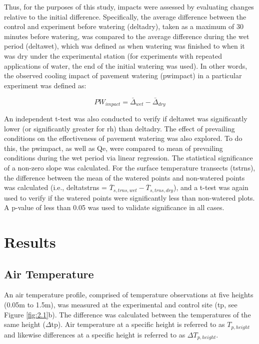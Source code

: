 \documentclass[final,3p,times,authoryear]{elsarticle}
\begin{document}
Thus, for the purposes of this study, impacts were assessed by evaluating changes relative to the initial difference. Specifically, the average difference between the control and experiment before watering (\gls{deltadry}), taken as a maximum of 30 minutes before watering, was compared to the average difference during the wet period (\gls{deltawet}), which was defined as when watering was finished to when it was dry under the experimental station (for experiments with repeated applications of water, the end of the initial watering was used). In other words, the observed cooling impact of pavement watering (\gls{pwimpact}) in a particular experiment was defined as:

\begin{equation}
PW_{impact} = \bar{\Delta}_{wet} - \bar{\Delta}_{dry}
\label{eq:2.2} 
\end{equation}

An independent t-test was also conducted to verify if \gls{deltawet} was significantly lower (or significantly greater for \gls{rh}) than \gls{deltadry}. The effect of prevailing conditions on the effectiveness of pavement watering was also explored. To do this, the \gls{pwimpact}, as well as \gls{Qe}, were compared to mean of prevailing conditions during the wet period via linear regression. The statistical significance of a non-zero slope was calculated. For the surface temperature transects (\gls{tstrns}), the difference between the mean of the watered points and non-watered points was calculated (i.e., \gls{deltatstrns} = $\overline{T}_{s,trns,wet} - \overline{T}_{s,trns,dry}$), and a t-test was again used to verify if the watered points were significantly less than non-watered plots. A \gls{p}-value of less than 0.05 was used to validate significance in all cases.

\section{Results}\label{sec:discussion3}
\subsection{Air Temperature}\label{sec:discussion3.1}

An air temperature profile, comprised of temperature observations at five heights (0.05m to 1.5m), was measured at the experimental and control site (\gls{tp}, see Figure \ref{fig:2.1}b). The difference was calculated between the temperatures of the same height ($\Delta$\gls{tp}). Air temperature at a specific height is referred to as $T_{p,height}$ and likewise differences at a specific height is referred to as $\Delta$$T_{p,height}$.
\end{document}
